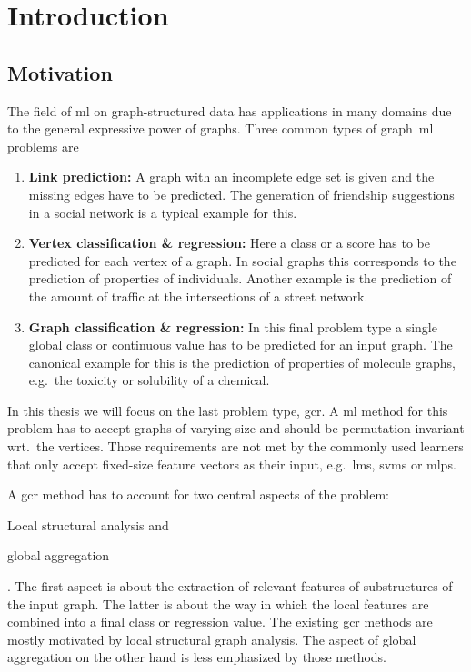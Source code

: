 \chapter{Introduction}%
\label{sec:intro}

\setcounter{page}{1}			%

\section{Motivation}%
\label{sec:intro:motivation}

The field of \ac{ml} on graph-structured data has applications in many domains due to the general expressive power of graphs.
Three common types of graph~\ac{ml} problems are
\begin{enumerate}[label=\textbf{\arabic*.}]
	\item \textbf{Link prediction:}
		A graph with an incomplete edge set is given and the missing edges have to be predicted.
		The generation of friendship suggestions in a social network is a typical example for this.
	\item \textbf{Vertex classification \& regression:}
		Here a class or a score has to be predicted for each vertex of a graph.
		In social graphs this corresponds to the prediction of properties of individuals.
		Another example is the prediction of the amount of traffic at the intersections of a street network.
	\item \textbf{Graph classification \& regression:}
		In this final problem type a single global class or continuous value has to be predicted for an input graph.
		The canonical example for this is the prediction of properties of molecule graphs, e.g.\ the toxicity or solubility of a chemical.
\end{enumerate}
In this thesis we will focus on the last problem type, \ac{gcr}.
A \ac{ml} method for this problem has to accept graphs of varying size and should be permutation invariant wrt.\ the vertices.
Those requirements are not met by the commonly used learners that only accept fixed-size feature vectors as their input, e.g.\ \acp{lm}, \acp{svm} or \acp{mlp}.

A \ac{gcr} method has to account for two central aspects of the problem:
\begin{enumerate*}
	\item Local structural analysis and
	\item global aggregation
\end{enumerate*}.
The first aspect is about the extraction of relevant features of substructures of the input graph.
The latter is about the way in which the local features are combined into a final class or regression value.
The existing \ac{gcr} methods are mostly motivated by local structural graph analysis.
The aspect of global aggregation on the other hand is less emphasized by those methods.

